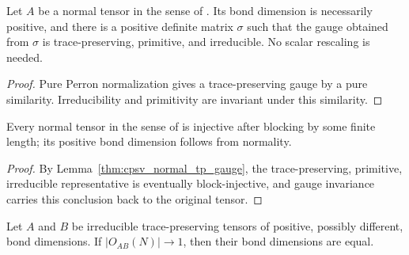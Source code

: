 \begin{lemma}
    \label{thm:cpsv_normal_tp_gauge}
    \leanok
    Let $A$ be a normal tensor in the sense of
    \cite[Section~2.2]{Cirac2016MPDO_arXiv}. Its bond dimension is necessarily
    positive, and there is a positive definite matrix $\sigma$ such that the
    gauge obtained from $\sigma$ is trace-preserving, primitive, and
    irreducible. No scalar rescaling is needed.
\end{lemma}

\begin{proof}\leanok
    Pure Perron normalization gives a trace-preserving gauge by a pure
    similarity. Irreducibility and primitivity are invariant under this
    similarity.
\end{proof}

\begin{lemma}
    \label{thm:cpsv_normal_eventually_injective}
    \leanok
    Every normal tensor in the sense of
    \cite[Section~2.2]{Cirac2016MPDO_arXiv} is injective after blocking by some
    finite length; its positive bond dimension follows from normality.
\end{lemma}

\begin{proof}\leanok
    By Lemma~\ref{thm:cpsv_normal_tp_gauge}, the trace-preserving,
    primitive, irreducible representative is eventually block-injective, and
    gauge invariance carries this conclusion back to the original tensor.
\end{proof}

\begin{lemma}
    \label{thm:rect_overlap_norm_one_dim_eq}
    \leanok
    Let $A$ and $B$ be irreducible trace-preserving tensors of positive,
    possibly different, bond dimensions. If $|O_{AB}(N)|\longrightarrow 1$,
    then their bond dimensions are equal.
\end{lemma}


